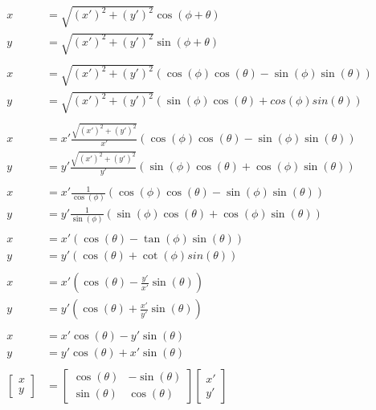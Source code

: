 \documentclass[11pt]{book}
\begin{document}
\begin{align*}
x &= \sqrt{(x')^2 + (y')^2}\cos(\phi + \theta) \\
y &= \sqrt{(x')^2 + (y')^2}\sin(\phi + \theta)\\
\\
x &= \sqrt{(x')^2 + (y')^2}(\cos(\phi)\cos(\theta) - \sin(\phi)\sin(\theta) ) \\
y &= \sqrt{(x')^2 + (y')^2}(\sin(\phi)\cos(\theta) + cos(\phi)sin(\theta) )\\
\\
x &= x'\frac{\sqrt{(x')^2 + (y')^2}}{x'}(\cos(\phi)\cos(\theta) - \sin(\phi)\sin(\theta) ) \\
y &= y'\frac{\sqrt{(x')^2 + (y')^2}}{y'}(\sin(\phi)\cos(\theta) + \cos(\phi)\sin(\theta) )\\
\\
x &= x'\frac{1}{\cos(\phi)}(\cos(\phi)\cos(\theta) - \sin(\phi)\sin(\theta) ) \\
y &= y'\frac{1}{\sin(\phi)}(\sin(\phi)\cos(\theta) + \cos(\phi)\sin(\theta) )\\
\\
x &= x'(\cos(\theta) - \tan(\phi)\sin(\theta) ) \\
y &= y'(\cos(\theta) + \cot(\phi)sin(\theta) ) \\
\\
x &= x'(\cos(\theta) - \frac{y'}{x'}\sin(\theta) ) \\
y &= y'(\cos(\theta) + \frac{x'}{y'}\sin(\theta) ) \\
\\
x &= x'\cos(\theta) - y'\sin(\theta) \\
y &= y'\cos(\theta) + x'\sin(\theta)  \\
\\
\left[
\begin{matrix}
x\\
y
\end{matrix}
\right] &=
\left[ \begin{matrix}
\cos(\theta) & -\sin(\theta) \\
\sin(\theta) &  \cos(\theta) 
\end{matrix}\right] 
\left[ \begin{matrix}
x' \\
y'
\end{matrix} \right]
\end{align*}
\end{document}
